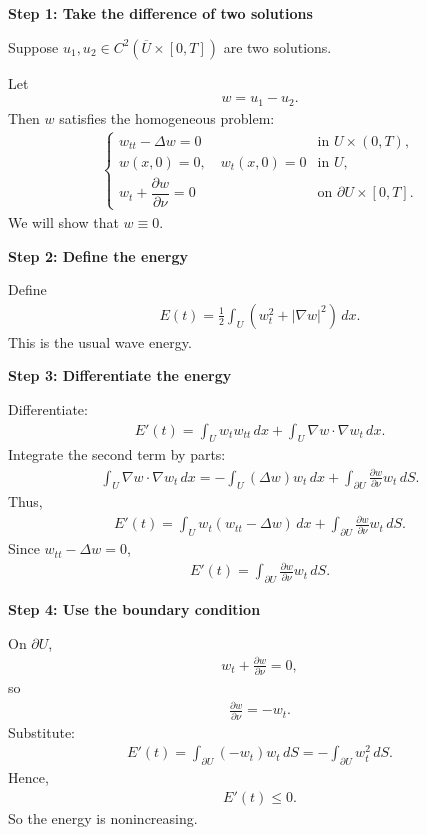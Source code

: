 \documentclass[12pt,a4paper]{report}
\begin{document}
\begin{description}

\item \textbf{Step 1: Take the difference of two solutions}

Suppose $u_1,u_2\in C^2(\overline U\times[0,T])$ are two solutions.

Let
\begin{align*}
w=u_1-u_2.
\end{align*}
Then $w$ satisfies the homogeneous problem:
\begin{align*}
\begin{cases}
w_{tt}-\Delta w=0 &\text{in }U\times(0,T),\\
w(x,0)=0,\quad w_t(x,0)=0 &\text{in }U,\\
w_t+\dfrac{\partial w}{\partial \nu}=0 &\text{on }\partial U\times[0,T].
\end{cases}
\end{align*}
We will show that $w\equiv 0$.

\item \textbf{Step 2: Define the energy}

Define
\begin{align*}
E(t)=\frac12\int_U \left(w_t^2+|\nabla w|^2\right)\,dx.
\end{align*}
This is the usual wave energy.

\item \textbf{Step 3: Differentiate the energy}

Differentiate:
\begin{align*}
E'(t)=\int_U w_tw_{tt}\,dx+\int_U \nabla w\cdot \nabla w_t\,dx.
\end{align*}
Integrate the second term by parts:
\begin{align*}
\int_U \nabla w\cdot\nabla w_t\,dx = -\int_U (\Delta w)w_t\,dx +\int_{\partial U}\frac{\partial w}{\partial \nu}w_t\,dS.
\end{align*}
Thus,
\begin{align*}
E'(t) = \int_U w_t(w_{tt}-\Delta w)\,dx +\int_{\partial U}\frac{\partial w}{\partial \nu}w_t\,dS.
\end{align*}
Since $w_{tt}-\Delta w=0$,
\begin{align*}
E'(t) = \int_{\partial U}\frac{\partial w}{\partial \nu}w_t\,dS.
\end{align*}

\item \textbf{Step 4: Use the boundary condition}

On $\partial U$,
\begin{align*}
w_t+\frac{\partial w}{\partial \nu}=0,
\end{align*}
so
\begin{align*}
\frac{\partial w}{\partial \nu}=-w_t.
\end{align*}
Substitute:
\begin{align*}
E'(t) = \int_{\partial U}(-w_t)w_t\,dS = -\int_{\partial U}w_t^2\,dS.
\end{align*}
Hence,
\begin{align*}
E'(t)\le 0.
\end{align*}
So the energy is nonincreasing.


\end{description}
\end{document}
